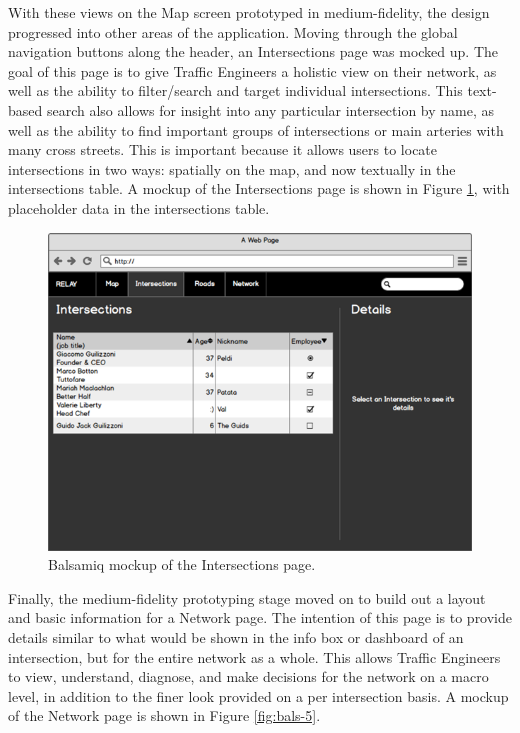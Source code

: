 \documentclass{report}
\begin{document}
With these views on the Map screen prototyped in medium-fidelity, the design progressed into other areas of the application.
Moving through the global navigation buttons along the header, an Intersections page was mocked up.
The goal of this page is to give Traffic Engineers a holistic view on their network, as well as the ability to filter/search and target individual intersections.
This text-based search also allows for insight into any particular intersection by name, as well as the ability to find important groups of intersections or main arteries with many cross streets.
This is important because it allows users to locate intersections in two ways: spatially on the map, and now textually in the intersections table.
A mockup of the Intersections page is shown in Figure \ref{fig:bals-4}, with placeholder data in the intersections table. \\

\begin{figure}[htbp!]
  \begin{centering}
    \includegraphics[scale=0.65]{figures/bals-4.png}
    \caption{Balsamiq mockup of the Intersections page.}
    \label{fig:bals-4}
  \end{centering}
\end{figure}

Finally, the medium-fidelity prototyping stage moved on to build out a layout and basic information for a Network page.
The intention of this page is to provide details similar to what would be shown in the info box or dashboard of an intersection, but for the entire network as a whole.
This allows Traffic Engineers to view, understand, diagnose, and make decisions for the network on a macro level, in addition to the finer look provided on a per intersection basis.
A mockup of the Network page is shown in Figure \ref{fig:bals-5}. \\
\end{document}
